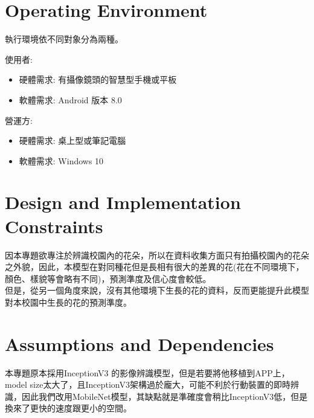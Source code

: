 \documentclass{scrreprt}
\begin{document}
\section{Operating Environment}
\begin{CJK}{UTF8}{bkai}
執行環境依不同對象分為兩種。 \\
\end{CJK}

\begin{CJK}{UTF8}{bkai}
使用者:
\end{CJK}
\begin{itemize}
\item
\begin{CJK}{UTF8}{bkai}
硬體需求:  有攝像鏡頭的智慧型手機或平板 
\end{CJK}
\item
\begin{CJK}{UTF8}{bkai}
軟體需求: Android  版本 8.0 
\end{CJK}
\end{itemize}

\begin{CJK}{UTF8}{bkai}
營運方: 
\end{CJK}
\begin{itemize}
\item
\begin{CJK}{UTF8}{bkai}
硬體需求:  桌上型或筆記電腦
\end{CJK}
\item
\begin{CJK}{UTF8}{bkai}
軟體需求:  Windows 10
\end{CJK}
\end{itemize}

\section{Design and Implementation Constraints}
\begin{CJK}{UTF8}{bkai}
	因本專題欲專注於辨識校園內的花朵，所以在資料收集方面只有拍攝校園內的花朵之外貌，因此，本模型在對同種花但是長相有很大的差異的花(花在不同環境下，顏色、樣貌等會略有不同)，預測準度及信心度會較低。 \\[6pt]
	但是，從另一個角度來說，沒有其他環境下生長的花的資料，反而更能提升此模型對本校園中生長的花的預測準度。
\end{CJK}

\section{Assumptions and Dependencies}
\begin{CJK}{UTF8}{bkai}
	本專題原本採用InceptionV3 的影像辨識模型，但是若要將他移植到APP上，model size太大了，且InceptionV3架構過於龐大，可能不利於行動裝置的即時辨識，因此我們改用MobileNet模型，其缺點就是準確度會稍比InceptionV3低，但是換來了更快的速度跟更小的空間。
\end{CJK}
\end{document}
